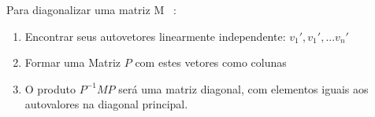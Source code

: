 %


Para diagonalizar uma matriz M ~\cite{aura2007}:
\begin{enumerate}
	\item Encontrar seus autovetores linearmente independente: $ v_1', v_1', ... v_n' $
	\item Formar uma Matriz $P$ com estes vetores como colunas
	\item O produto $ P^{-1} M P $ será uma matriz diagonal, com elementos iguais aos autovalores na diagonal principal.
\end{enumerate}




